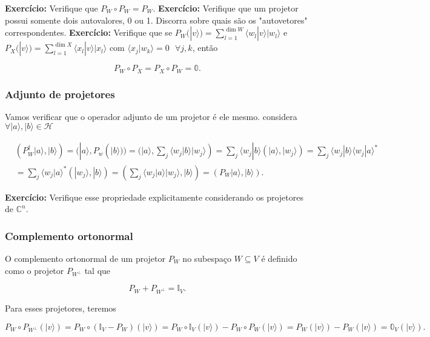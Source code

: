 \documentclass[11pt]{article}
\begin{document}
    \textbf{Exercício:} Verifique que \(P_{W}\circ P_{W}=P_{W}\).
\textbf{Exercício:} Verifique que um projetor possui somente dois
autovalores, 0 ou 1. Discorra sobre quais são os "autovetores"
correspondentes. \textbf{Exercício:} Verifique que se
\(P_{W}(|v\rangle) = \sum_{l=1}^{\dim W}\langle w_{l}|v\rangle|w_{l}\rangle\)
e
\(P_{X}(|v\rangle) = \sum_{l=1}^{\dim X}\langle x_{l}|v\rangle|x_{l}\rangle\)
com \(\langle x_{j}|w_{k}\rangle=0\text{ } \forall j,k\), então

\begin{equation}
P_{W}\circ P_{X} = P_{X}\circ P_{W} = \mathbb{0}.
\end{equation}

\subsubsection{Adjunto de projetores}\label{adjunto-de-projetores}

Vamos verificar que o operador adjunto de um projetor é ele mesmo.
considera \(\forall|a\rangle,|b\rangle\in\mathcal{H}\)

\begin{align}
& (P_{W}^{\dagger}|a\rangle,|b\rangle)=(|a\rangle,P_{w}(|b\rangle)) = (|a\rangle,\sum_{j}\langle w_{j}|b\rangle|w_{j}\rangle)  = \sum_{j}\langle w_{j}|b\rangle(|a\rangle,|w_{j}\rangle) = \sum_{j}\langle w_{j}|b\rangle\langle w_{j}|a\rangle^{*} \\
& = \sum_{j}\langle w_{j}|a\rangle^{*}(|w_{j}\rangle,|b\rangle) = (\sum_{j}\langle w_{j}|a\rangle|w_{j}\rangle,|b\rangle) = (P_{W}|a\rangle,|b\rangle).
\end{align}

\textbf{Exercício:} Verifique esse propriedade explicitamente
considerando os projetores de \(\mathbb{C}^{n}\).

\subsubsection{Complemento ortonormal}\label{complemento-ortonormal}

O complemento ortonormal de um projetor \(P_{W}\) no subespaço
\(W\subseteq V\) é definido como o projetor \(P_{W^{\perp}}\) tal que

\begin{equation}
P_{W}+P_{W^{\perp}}=\mathbb{I}_{V}.
\end{equation}

Para esses projetores, teremos

\begin{equation}
P_{W}\circ P_{W^{\perp}}(|v\rangle) = P_{W}\circ(\mathbb{I}_{V}-P_{W})(|v\rangle) = P_{W}\circ\mathbb{I}_{V}(|v\rangle)-P_{W}\circ P_{W}(|v\rangle) = P_{W}(|v\rangle)-P_{W}(|v\rangle) = \mathbb{0}_{V}(|v\rangle).
\end{equation}
\end{document}
